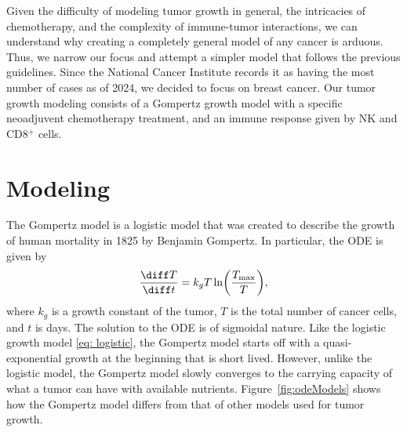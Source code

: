 \documentclass[11pt]{amsart}
\begin{document}
Given the difficulty of modeling tumor growth in general, the intricacies of chemotherapy, and the complexity of immune-tumor interactions, we can understand why creating a completely general model of any cancer is arduous.
Thus, we narrow our focus and attempt a simpler model that follows the previous guidelines.
Since the National Cancer Institute records it as having the most number of cases as of 2024, we decided to focus on breast cancer.
Our tumor growth modeling consists of a Gompertz growth model with a specific neoadjuvent chemotherapy treatment, and an immune response given by NK and CD8$^+$ cells.


\section{Modeling}



The Gompertz model is a logistic model that was created to describe the growth of human mortality in 1825 by Benjamin Gompertz.
In particular, the ODE is given by
\begin{equation}
	\frac{\diff T}{\diff t} = k_g T \ln \biggl(\frac{T_{\max}}{T} \biggr) \label{eq: gompertz},
\end{equation}
where $k_g$ is a growth constant of the tumor, $T$ is the total number of cancer cells, and $t$ is days.
The solution to the ODE is of sigmoidal nature.
Like the logistic growth model \eqref{eq: logistic}, the Gompertz model starts off with a quasi-exponential growth at the beginning that is short lived.
However, unlike the logistic model, the Gompertz model slowly converges to the carrying capacity of what a tumor can have with available nutrients.
Figure~\ref{fig:odeModels} shows how the Gompertz model differs from that of other models used for tumor growth.
\end{document}
